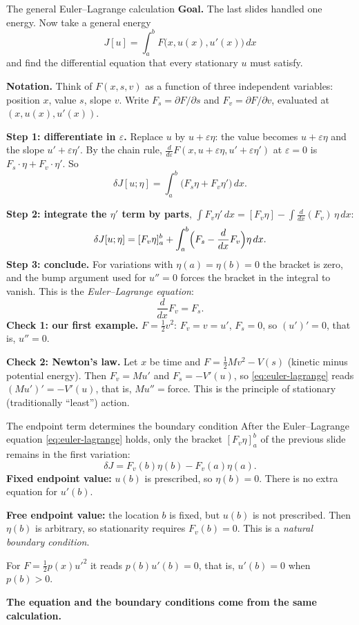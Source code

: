 \documentclass[11pt]{beamer}
\newcommand{\dd}{\,d}
\begin{document}
\begin{frame}[allowframebreaks=1.00]{The general Euler--Lagrange calculation}
\small
\textbf{Goal.} The last slides handled one energy. Now take a general energy
\[
 J[u]=\int_a^b F\bigl(x,u(x),u'(x)\bigr)\dd x
\]
and find the differential equation that every stationary \(u\) must satisfy.

\textbf{Notation.} Think of \(F(x,s,v)\) as a function of three independent variables: position \(x\),
value \(s\), slope \(v\). Write \(F_s=\partial F/\partial s\) and \(F_v=\partial F/\partial v\), evaluated at
\((x,u(x),u'(x))\).

\textbf{Step 1: differentiate in \(\varepsilon\).} Replace \(u\) by \(u+\varepsilon\eta\): the value becomes \(u+\varepsilon\eta\) and the
slope \(u'+\varepsilon\eta'\). By the chain rule, \(\frac{d}{d\varepsilon}F(x,u+\varepsilon\eta,u'+\varepsilon\eta')\) at \(\varepsilon=0\) is
\(F_s\cdot\eta+F_v\cdot\eta'\). So
\[
 \delta J[u;\eta]=\int_a^b\bigl(F_s\eta+F_v\eta'\bigr)\dd x .
\]
\par\framebreak\par
\textbf{Step 2: integrate the \(\eta'\) term by parts}, \(\int F_v\eta'\,dx=[F_v\eta]-\int\frac{d}{dx}(F_v)\,\eta\,dx\):
\[
 \delta J[u;\eta]
 =[F_v\eta]_a^b+\int_a^b\Bigl(F_s-\frac{d}{dx}F_v\Bigr)\eta\dd x.
\]
\textbf{Step 3: conclude.} For variations with \(\eta(a)=\eta(b)=0\) the bracket is zero, and the bump argument
used for \(u''=0\) forces the bracket in the integral to vanish. This is the
\emph{Euler--Lagrange equation}:
\begin{equation}
 \frac{d}{dx}F_v=F_s.\label{eq:euler-lagrange}
\end{equation}
\textbf{Check 1: our first example.} \(F=\frac12v^2\): \(F_v=v=u'\), \(F_s=0\), so \((u')'=0\), that is, \(u''=0\). \checkmark

\textbf{Check 2: Newton's law.} Let \(x\) be time and \(F=\tfrac12Mv^2-V(s)\) (kinetic minus potential energy).
Then \(F_v=Mu'\) and \(F_s=-V'(u)\), so \eqref{eq:euler-lagrange} reads \((Mu')'=-V'(u)\), that is,
\(Mu''=\)force. This is the principle of stationary (traditionally ``least'') action.
\end{frame}

\begin{frame}{The endpoint term determines the boundary condition}
\small
After the Euler--Lagrange equation \eqref{eq:euler-lagrange} holds, only the bracket
$[F_v\eta]_a^b$ of the previous slide remains in the first variation:
\[
 \delta J=F_v(b)\eta(b)-F_v(a)\eta(a).
\]
\textbf{Fixed endpoint value:} $u(b)$ is prescribed, so $\eta(b)=0$.
There is no extra equation for $u'(b)$.

\medskip
\textbf{Free endpoint value:} the location $b$ is fixed, but $u(b)$ is not prescribed.
Then $\eta(b)$ is arbitrary, so stationarity requires $F_v(b)=0$.
This is a \emph{natural boundary condition}.

\medskip
For $F=\tfrac12p(x)u'^2$ it reads $p(b)u'(b)=0$, that is, $u'(b)=0$ when $p(b)>0$.

\medskip
\textbf{The equation and the boundary conditions come from the same calculation.}
\end{frame}
\end{document}
